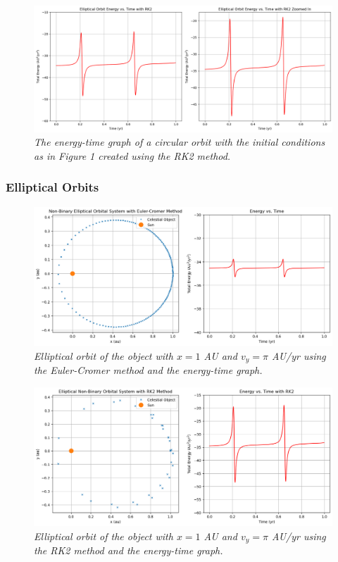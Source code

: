 \documentclass[12 pt, a4paper]{article}
\begin{document}
\begin{figure}[H]
  \includegraphics[width=0.7\linewidth]{evtrk2elliptic.png}
  \centering
  \caption{\textit{The energy-time graph of a circular orbit with the initial conditions as in Figure 1 created using the RK2 method.}}
\end{figure}

\subsubsection{Elliptical Orbits}
\begin{figure}[H]
  \includegraphics[width=0.7\linewidth]{eulercromerelliptic.png}
  \centering
  \caption{\textit{Elliptical orbit of the object with $x = 1$ AU and $v_y = \pi$ AU/yr using the Euler-Cromer method and the energy-time graph.}} 
\end{figure}

\begin{figure}[H]
  \includegraphics[width=0.7\linewidth]{rk2elliptic.png}
  \centering
  \caption{\textit{Elliptical orbit of the object with $x = 1$ AU and $v_y = \pi$ AU/yr using the RK2 method and the energy-time graph.}} 
\end{figure}
\end{document}
